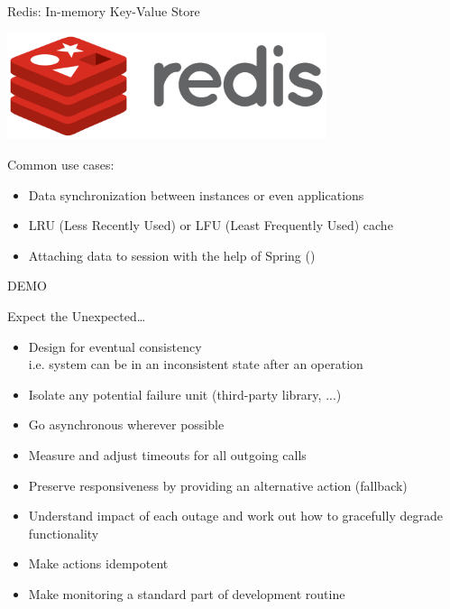 \begin{frame}{Redis: In-memory Key-Value Store}
\begin{center}
\includegraphics[width=0.7\textwidth]{../Service2ServiceCommunication/images/redis}
\end{center}
Common use cases:
\begin{itemize}
	\item Data synchronization between instances or even applications
	\item LRU (Less Recently Used) or LFU (Least Frequently Used) cache
	\item Attaching data to session with the help of Spring ()
\end{itemize}

\begin{center}
\Huge DEMO
\end{center}

\end{frame}

\begin{frame}{Expect the Unexpected\dots}
\begin{itemize}
\item Design for eventual consistency \\i.e. system can be in an inconsistent state after an operation
\item Isolate any potential failure unit (third-party library, ...)
\item Go asynchronous wherever possible %
\item Measure and adjust timeouts for all outgoing calls 
\item Preserve responsiveness by providing an alternative action (fallback)
\item Understand impact of each outage and work out how to gracefully degrade functionality
\item Make actions idempotent
\item Make monitoring a standard part of development routine
\end{itemize}
\end{frame}

